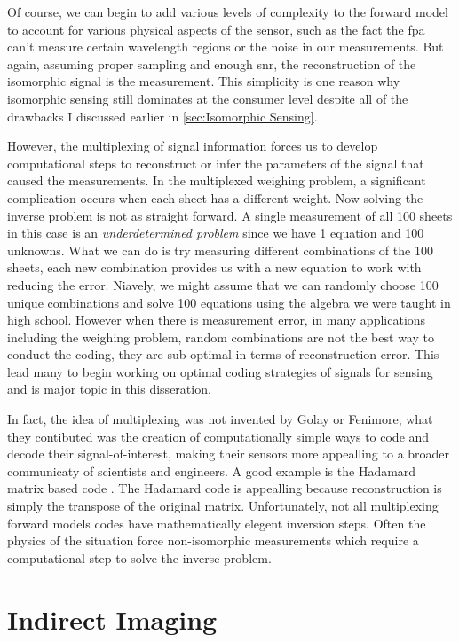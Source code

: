 Of course, we can begin to add various levels of complexity to the forward model to account for various physical aspects of the sensor, such as the fact the \gls{fpa} can't measure certain wavelength regions or the noise in our measurements. But again, assuming proper sampling and enough \gls{snr}, the reconstruction of the isomorphic signal is the measurement. This simplicity is one reason why isomorphic sensing still dominates at the consumer level despite all of the drawbacks I discussed earlier in \autoref{sec:Isomorphic Sensing}. 

However, the multiplexing of signal information forces us to develop computational steps to reconstruct or infer the parameters of the signal that caused the measurements. In the multiplexed weighing problem, a significant complication occurs when each sheet has a different weight. Now solving the inverse problem is not as straight forward. A single measurement of all 100 sheets in this case is an \emph{underdetermined problem} since we have 1 equation and 100 unknowns. What we can do is try measuring different combinations of the 100 sheets, each new combination provides us with a new equation to work with reducing the error. Niavely, we might assume that we can randomly choose 100 unique combinations and solve 100 equations using the algebra we were taught in high school. However when there is measurement error, in many applications including the weighing problem, random combinations are not the best way to conduct the coding, they are sub-optimal in terms of reconstruction error. This lead many to begin working on optimal coding strategies of signals for sensing and is major topic in this disseration.

In fact, the idea of multiplexing was not invented by Golay or Fenimore, what they contibuted was the creation of computationally simple ways to code and decode their signal-of-interest, making their sensors more appealling to a broader communicaty of scientists and engineers. A good example is the Hadamard matrix based code \cite{sloane1969codes}. The Hadamard code is appealling because reconstruction is simply the transpose of the original matrix. Unfortunately, not all multiplexing forward models codes have mathematically elegent inversion steps. Often the physics of the situation force non-isomorphic measurements which require a computational step to solve the inverse problem. 

\section{Indirect Imaging}


